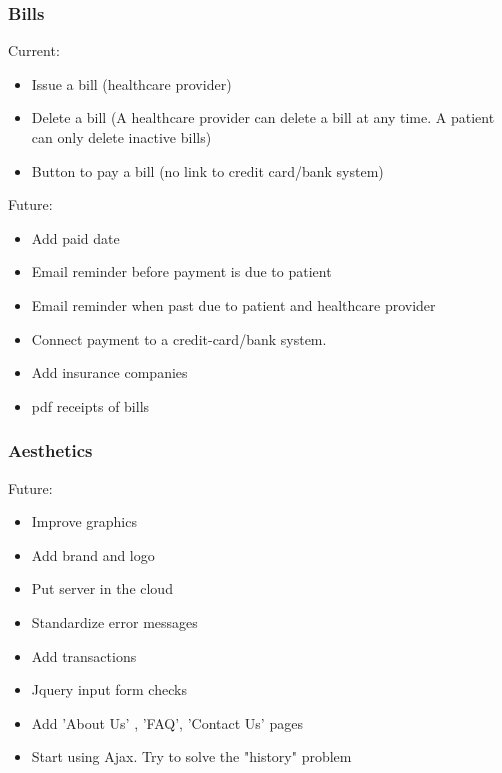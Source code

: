 \documentclass[10pt]{report}
\begin{document}
\subsubsection{Bills}

Current:
\begin{itemize}
\item Issue a bill (healthcare provider)
\item Delete a bill (A healthcare provider can delete a bill at any time. A patient can only delete inactive bills)
\item Button to pay a bill (no link to credit card/bank system)
\end{itemize}
Future:
\begin{itemize}
\item Add paid date
\item Email reminder before payment is due to patient
\item Email reminder when past due to patient and healthcare provider
\item Connect payment to a credit-card/bank system.
\item Add insurance companies
\item pdf receipts of bills
\end{itemize}

\subsubsection{Aesthetics}
Future: 
\begin{itemize}
\item Improve graphics
\item Add brand and logo
\item Put server in the cloud
\item Standardize error messages
\item Add transactions
\item Jquery input form checks
\item Add 'About Us' , 'FAQ', 'Contact Us' pages 
\item Start using Ajax. Try to solve the "history" problem
\end{itemize}
\end{document}

